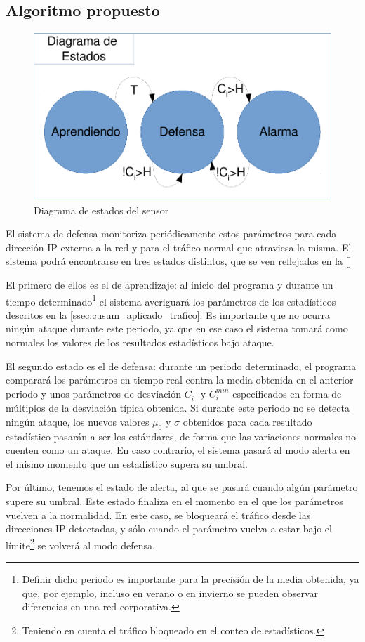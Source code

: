 \subsection{Algoritmo propuesto}
\begin{figure}[htbp]
\centering
\includegraphics[width=0.8\columnwidth]{CapituloCusum/Figuras/DiagramaEstados-crop}
\caption{Diagrama de estados del sensor}
\label{fig:diagrama_estados} 
\end{figure}

El sistema de defensa \redborderddos monitoriza periódicamente estos parámetros
para cada dirección IP externa a la red y para el tráfico normal que atraviesa
la misma. El sistema podrá encontrarse en tres estados distintos, que se ven reflejados
en la \autoref{}

El primero de ellos es el de aprendizaje: al
inicio del programa y durante un tiempo determinado\footnote{Definir dicho
periodo es importante para la precisión de la media obtenida, ya que, por ejemplo, incluso en
verano o en invierno se pueden observar diferencias en una red corporativa.}
el sistema averiguará los parámetros de los estadísticos descritos en la 
\autoref{ssec:cusum_aplicado_trafico}. Es importante que no ocurra ningún
ataque durante este periodo, ya que en ese caso el sistema tomará como normales
los valores de los resultados estadísticos bajo ataque. %

El segundo estado es el de defensa: durante un periodo determinado, el programa comparará
los parámetros en tiempo real contra la media obtenida en el anterior periodo y
unos parámetros de desviación $C_i^+$ y $C_i^{min}$ especificados en forma de múltiplos
de la desviación típica obtenida. Si durante este periodo no se detecta ningún ataque, los nuevos
valores $\mu_0$ y $\sigma$ obtenidos para cada resultado estadístico pasarán a ser los estándares, de
forma que las variaciones normales no cuenten como un ataque. En caso contrario, el sistema pasará al modo alerta en el mismo
momento que un estadístico supera su umbral. %

Por último, tenemos el estado de alerta, al que se pasará cuando algún parámetro supere su umbral. Este estado finaliza en el
momento en el que los parámetros vuelven a la normalidad. En este caso, se bloqueará el tráfico desde
las direcciones IP detectadas, y sólo cuando el parámetro vuelva a estar bajo el límite\footnote{Teniendo
en cuenta el tráfico bloqueado en el conteo de estadísticos.} se volverá al modo defensa.

\endinput
